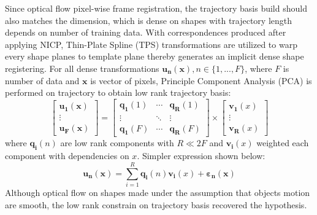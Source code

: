 Since optical flow pixel-wise frame registration, the trajectory basis build should also matches the dimension, which is dense on shapes with trajectory length depends on number of training data. With correspondences produced after applying NICP, Thin-Plate Spline (TPS)\cite{?} transformations are utilized to warp every shape planes to template plane thereby generates an implicit dense shape registering. For all dense transformations $\bm{u_n}(\bm{x}), n \in \{1,...,F\}$, where $F$ is number of data and $\bm{x}$ is vector of pixels, Principle Component Analysis (PCA) is performed on trajectory to obtain low rank trajectory basis:
\begin{equation}
    \begin{bmatrix}
        \bm{u_1}(\bm{x}) \\
        \vdots \\
        \bm{u_F}(\bm{x})
    \end{bmatrix}
    =
    \begin{bmatrix}
        \bm{q_1}(1) & \cdots & \bm{q_R}(1) \\
        \vdots      & \ddots & \vdots  \\
        \bm{q_1}(F) & \cdots & \bm{q_R}(F)
    \end{bmatrix}
    \times
    \begin{bmatrix}
        \bm{v_1}(x) \\
        \vdots \\
        \bm{v_R}(x)
    \end{bmatrix}
\end{equation}
where $\bm{q_i}(n)$ are low rank components with $R \ll 2F$ and $\bm{v_i}(x)$ weighted each component with dependencies on $x$. Simpler expression shown below:
\begin{equation}
    \bm{u_n}(\bm{x})=\sum_{i=1}^R\bm{q_i}(n)\bm{v_i}(x)+\bm{\varepsilon_n}(\bm{x})
\end{equation}
Although optical flow on shapes made under the assumption that objects motion are smooth, the low rank constrain on trajectory basis recovered the hypothesis.

